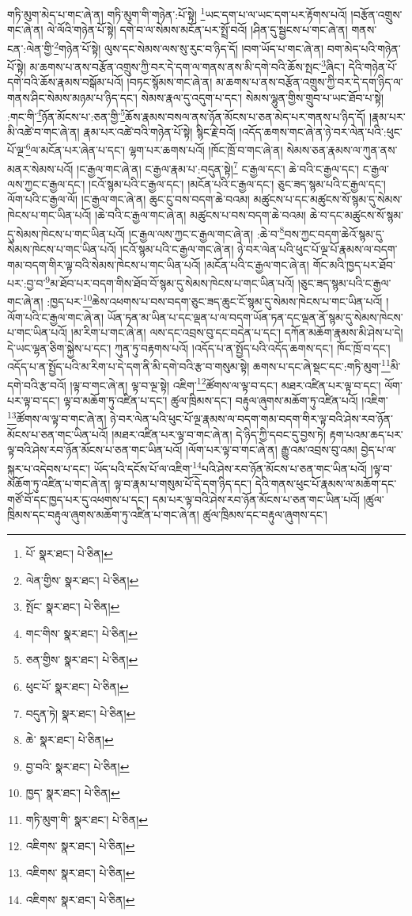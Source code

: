 གཏི་མུག་མེད་པ་གང་ཞེ་ན། གཏི་མུག་གི་གཉེན་:པོ་སྟེ། \footnote{པོ་  སྣར་ཐང་།  པེ་ཅིན། }ཡང་དག་པ་ལ་ཡང་དག་པར་རྟོགས་པའོ། །བརྩོན་འགྲུས་གང་ཞེ་ན། ལེ་ལོའི་གཉེན་པོ་སྟེ། དགེ་བ་ལ་སེམས་མངོན་པར་སྤྲོ་བའོ། །ཤིན་དུ་སྦྱངས་པ་གང་ཞེ་ན། གནས་ངན་:ལེན་གྱི་\footnote{ལེན་གྱིས་  སྣར་ཐང་།  པེ་ཅིན། }གཉེན་པོ་སྟེ། ལུས་དང་སེམས་ལས་སུ་རུང་བ་ཉིད་དོ། །བག་ཡོད་པ་གང་ཞེ་ན། བག་མེད་པའི་གཉེན་པོ་སྟེ། མ་ཆགས་པ་ནས་བརྩོན་འགྲུས་ཀྱི་བར་དེ་དག་ལ་གནས་ནས་མི་དགེ་བའི་ཆོས་སྤང་\footnote{སྤོང་  སྣར་ཐང་།  པེ་ཅིན། }ཞིང་། དེའི་གཉེན་པོ་དགེ་བའི་ཆོས་རྣམས་བསྒོམ་པའོ། །བཏང་སྙོམས་གང་ཞེ་ན། མ་ཆགས་པ་ནས་བརྩོན་འགྲུས་ཀྱི་བར་དེ་དག་ཉིད་ལ་གནས་ཤིང་སེམས་མཉམ་པ་ཉིད་དང་། སེམས་རྣལ་དུ་འདུག་པ་དང་། སེམས་ལྷུན་གྱིས་གྲུབ་པ་ཡང་ཐོབ་པ་སྟེ། :གང་གི་\footnote{གང་གིས་  སྣར་ཐང་།  པེ་ཅིན། }ཉོན་མོངས་པ་:ཅན་གྱི་\footnote{ཅན་གྱིས་  སྣར་ཐང་།  པེ་ཅིན། }ཆོས་རྣམས་བསལ་ནས་ཉོན་མོངས་པ་ཅན་མེད་པར་གནས་པ་ཉིད་དོ། །རྣམ་པར་མི་འཚེ་བ་གང་ཞེ་ན། རྣམ་པར་འཚེ་བའི་གཉེན་པོ་སྟེ། སྙིང་རྗེ་བའོ། །འདོད་ཆགས་གང་ཞེ་ན་ཉེ་བར་ལེན་པའི་:ཕུང་པོ་ལྔ་\footnote{ཕུང་པོ་  སྣར་ཐང་།  པེ་ཅིན། }ལ་མངོན་པར་ཞེན་པ་དང་། ལྷག་པར་ཆགས་པའོ། །ཁོང་ཁྲོ་བ་གང་ཞེ་ན། སེམས་ཅན་རྣམས་ལ་ཀུན་ནས་མནར་སེམས་པའོ། །ང་རྒྱལ་གང་ཞེ་ན། ང་རྒྱལ་རྣམ་པ་:བདུན་སྟེ།\footnote{བདུན་ཏེ།  སྣར་ཐང་།  པེ་ཅིན། } ང་རྒྱལ་དང་། ཆེ་བའི་ང་རྒྱལ་དང་། ང་རྒྱལ་ལས་ཀྱང་ང་རྒྱལ་དང་། །ངའོ་སྙམ་པའི་ང་རྒྱལ་དང་། །མངོན་པའི་ང་རྒྱལ་དང་། ཅུང་ཟད་སྙམ་པའི་ང་རྒྱལ་དང་། ལོག་པའི་ང་རྒྱལ་ལོ། །ང་རྒྱལ་གང་ཞེ་ན། ཆུང་ངུ་བས་བདག་ཆེ་བའམ། མཚུངས་པ་དང་མཚུངས་སོ་སྙམ་དུ་སེམས་ཁེངས་པ་གང་ཡིན་པའོ། །ཆེ་བའི་ང་རྒྱལ་གང་ཞེ་ན། མཚུངས་པ་བས་བདག་ཆེ་བའམ། ཆེ་བ་དང་མཚུངས་སོ་སྙམ་དུ་སེམས་ཁེངས་པ་གང་ཡིན་པའོ། །ང་རྒྱལ་ལས་ཀྱང་ང་རྒྱལ་གང་ཞེ་ན། :ཆེ་བ་\footnote{ཆེ་  སྣར་ཐང་།  པེ་ཅིན། }བས་ཀྱང་བདག་ཆེའོ་སྙམ་དུ་སེམས་ཁེངས་པ་གང་ཡིན་པའོ། །ངའོ་སྙམ་པའི་ང་རྒྱལ་གང་ཞེ་ན། ཉེ་བར་ལེན་པའི་ཕུང་པོ་ལྔ་པོ་རྣམས་ལ་བདག་གམ་བདག་གིར་ལྟ་བའི་སེམས་ཁེངས་པ་གང་ཡིན་པའོ། །མངོན་པའི་ང་རྒྱལ་གང་ཞེ་ན། གོང་མའི་ཁྱད་པར་ཐོབ་པར་:བྱ་བ་\footnote{བྱ་བའི་  སྣར་ཐང་།  པེ་ཅིན། }མ་ཐོབ་པར་བདག་གིས་ཐོབ་བོ་སྙམ་དུ་སེམས་ཁེངས་པ་གང་ཡིན་པའོ། །ཅུང་ཟད་སྙམ་པའི་ང་རྒྱལ་གང་ཞེ་ན། :ཁྱད་པར་\footnote{ཁྱད་  སྣར་ཐང་།  པེ་ཅིན། }ཆེས་འཕགས་པ་བས་བདག་ཅུང་ཟད་ཆུང་ངོ་སྙམ་དུ་སེམས་ཁེངས་པ་གང་ཡིན་པའོ། །ལོག་པའི་ང་རྒྱལ་གང་ཞེ་ན། ཡོན་ཏན་མ་ཡིན་པ་དང་ལྡན་པ་ལ་བདག་ཡོན་ཏན་དང་ལྡན་ནོ་སྙམ་དུ་སེམས་ཁེངས་པ་གང་ཡིན་པའོ། །མ་རིག་པ་གང་ཞེ་ན། ལས་དང་འབྲས་བུ་དང་བདེན་པ་དང་། དཀོན་མཆོག་རྣམས་མི་ཤེས་པ་དེ། དེ་ཡང་ལྷན་ཅིག་སྐྱེས་པ་དང་། ཀུན་ཏུ་བརྟགས་པའོ། །འདོད་པ་ན་སྤྱོད་པའི་འདོད་ཆགས་དང་། ཁོང་ཁྲོ་བ་དང་། འདོད་པ་ན་སྤྱོད་པའི་མ་རིག་པ་དེ་དག་ནི་མི་དགེ་བའི་རྩ་བ་གསུམ་སྟེ། ཆགས་པ་དང་ཞེ་སྡང་དང་:གཏི་མུག་\footnote{གཏི་མུག་གི་  སྣར་ཐང་།  པེ་ཅིན། }མི་དགེ་བའི་རྩ་བའོ། །ལྟ་བ་གང་ཞེ་ན། ལྟ་བ་ལྔ་སྟེ། འཇིག་\footnote{འཇིགས་  སྣར་ཐང་།  པེ་ཅིན། }ཚོགས་ལ་ལྟ་བ་དང་། མཐར་འཛིན་པར་ལྟ་བ་དང་། ལོག་པར་ལྟ་བ་དང་། ལྟ་བ་མཆོག་ཏུ་འཛིན་པ་དང་། ཚུལ་ཁྲིམས་དང་། བརྟུལ་ཞུགས་མཆོག་ཏུ་འཛིན་པའོ། །འཇིག་\footnote{འཇིགས་  སྣར་ཐང་།  པེ་ཅིན། }ཚོགས་ལ་ལྟ་བ་གང་ཞེ་ན། ཉེ་བར་ལེན་པའི་ཕུང་པོ་ལྔ་རྣམས་ལ་བདག་གམ་བདག་གིར་ལྟ་བའི་ཤེས་རབ་ཉོན་མོངས་པ་ཅན་གང་ཡིན་པའོ། །མཐར་འཛིན་པར་ལྟ་བ་གང་ཞེ་ན། དེ་ཉིད་ཀྱི་དབང་དུ་བྱས་ཏེ། རྟག་པའམ་ཆད་པར་ལྟ་བའི་ཤེས་རབ་ཉོན་མོངས་པ་ཅན་གང་ཡིན་པའོ། །ལོག་པར་ལྟ་བ་གང་ཞེ་ན། རྒྱུ་འམ་འབྲས་བུ་འམ། བྱེད་པ་ལ་སྐུར་པ་འདེབས་པ་དང་། ཡོད་པའི་དངོས་པོ་ལ་འཇིག་\footnote{འཇིགས་  སྣར་ཐང་།  པེ་ཅིན། }པའི་ཤེས་རབ་ཉོན་མོངས་པ་ཅན་གང་ཡིན་པའོ། །ལྟ་བ་མཆོག་ཏུ་འཛིན་པ་གང་ཞེ་ན། ལྟ་བ་རྣམ་པ་གསུམ་པོ་དེ་དག་ཉིད་དང་། དེའི་གནས་ཕུང་པོ་རྣམས་ལ་མཆོག་དང་གཙོ་བོ་དང་ཁྱད་པར་དུ་འཕགས་པ་དང་། དམ་པར་ལྟ་བའི་ཤེས་རབ་ཉོན་མོངས་པ་ཅན་གང་ཡིན་པའོ། །ཚུལ་ཁྲིམས་དང་བརྟུལ་ཞུགས་མཆོག་ཏུ་འཛིན་པ་གང་ཞེ་ན། ཚུལ་ཁྲིམས་དང་བརྟུལ་ཞུགས་དང་། 